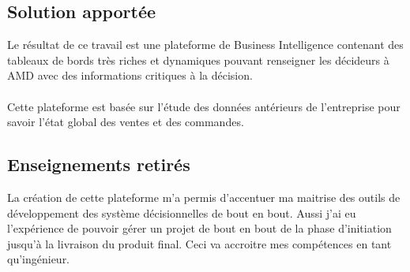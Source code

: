 \subsection{Solution apportée}
Le résultat de ce travail est une plateforme de Business Intelligence contenant des tableaux de bords très riches et dynamiques pouvant renseigner les décideurs à AMD avec des informations critiques à la décision.
\paragraph{}
Cette plateforme est basée sur l’étude des données antérieurs de l’entreprise pour savoir l’état global des ventes et des commandes. 

\subsection{Enseignements retirés}

La création de cette plateforme m’a permis d’accentuer ma maitrise des outils de développement des système décisionnelles de bout en bout. Aussi j’ai eu l’expérience de pouvoir gérer un projet de bout en bout de la phase d’initiation jusqu’à la livraison du produit final. Ceci va accroitre mes compétences en tant qu’ingénieur. 


